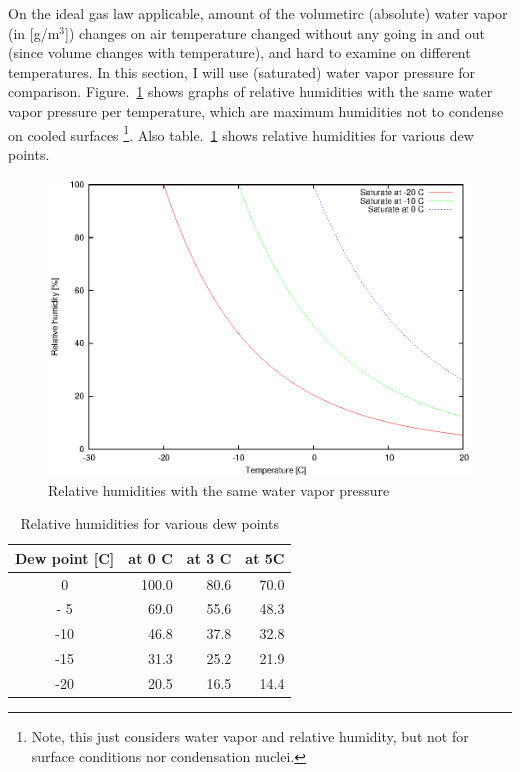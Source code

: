 \documentclass[a4paper,notitlepage]{article}
\begin{document}
On the ideal gas law applicable, amount of the volumetirc (absolute) water 
vapor (in [g/m${}^3$]) 
changes on air temperature changed without any going in and out (since volume 
changes with temperature), and hard to examine on different temperatures. 
In this section, I will use (saturated) water vapor pressure for comparison. 
Figure.~\ref{fig:sat-humid-temp} shows graphs of relative humidities with the 
same water vapor pressure per temperature, which are maximum humidities 
not to condense on cooled surfaces 
\footnote{Note, this just considers water vapor and relative humidity, but not 
for surface conditions nor condensation nuclei.}. 
Also table.~\ref{tab:sat-humid-temp} shows relative humidities for 
various dew points. 

\begin{figure}[htb]
  \begin{center}
    \includegraphics{PFS-SE-IPMU-00002-sat-humid-temp.eps}
  \end{center}
  \caption{Relative humidities with the same water vapor pressure}
  \label{fig:sat-humid-temp}
\end{figure}

\begin{table}[htb]
\begin{center}
\caption{Relative humidities for various dew points}
\label{tab:sat-humid-temp}
\begin{tabular}{c||r|r|r}
Dew point [C] & at 0 C & at 3 C & at 5C \\
\hline
  0 & 100.0 & 80.6 & 70.0 \\
- 5 &  69.0 & 55.6 & 48.3 \\
-10 &  46.8 & 37.8 & 32.8 \\
-15 &  31.3 & 25.2 & 21.9 \\
-20 &  20.5 & 16.5 & 14.4 \\
\end{tabular}
\end{center}
\end{table}
\end{document}
